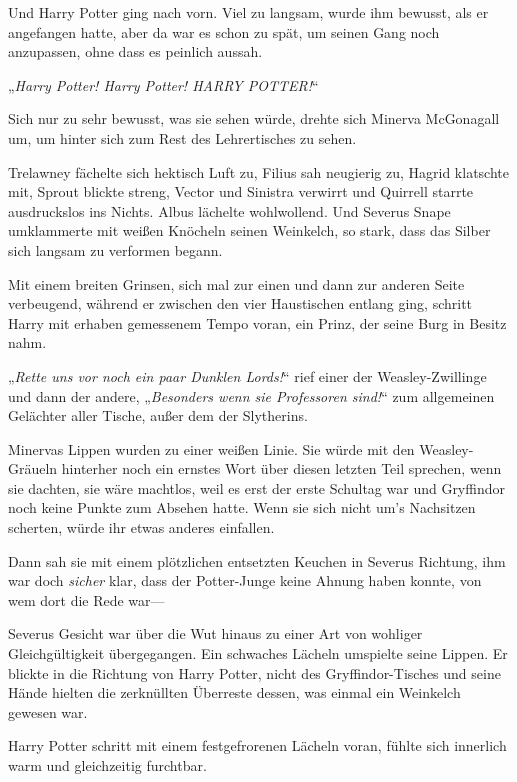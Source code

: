 {Und Harry Potter ging nach vorn. Viel zu langsam, wurde ihm bewusst, als er angefangen hatte, aber da war es schon zu spät, um seinen Gang noch anzupassen, ohne dass es peinlich aussah.

\later

„\emph{Harry Potter! Harry Potter! HARRY POTTER!}“

Sich nur zu sehr bewusst, was sie sehen würde, drehte sich Minerva McGonagall um, um hinter sich zum Rest des Lehrertisches zu sehen.

Trelawney fächelte sich hektisch Luft zu, Filius sah neugierig zu, Hagrid klatschte mit, Sprout blickte streng, Vector und Sinistra verwirrt und Quirrell starrte ausdruckslos ins Nichts. Albus lächelte wohlwollend. Und Severus Snape umklammerte mit weißen Knöcheln seinen Weinkelch, so stark, dass das Silber sich langsam zu verformen begann.

Mit einem breiten Grinsen, sich mal zur einen und dann zur anderen Seite verbeugend, während er zwischen den vier Haustischen entlang ging, schritt Harry mit erhaben gemessenem Tempo voran, ein Prinz, der seine Burg in Besitz nahm.

„\emph{Rette uns vor noch ein paar Dunklen Lords!}“ rief einer der Weasley-Zwillinge und dann der andere, „\emph{Besonders wenn sie Professoren sind!}“ zum allgemeinen Gelächter aller Tische, außer dem der Slytherins.

Minervas Lippen wurden zu einer weißen Linie. Sie würde mit den Weasley-Gräueln hinterher noch ein ernstes Wort über diesen letzten Teil sprechen, wenn sie dachten, sie wäre machtlos, weil es erst der erste Schultag war und Gryffindor noch keine Punkte zum Absehen hatte. Wenn sie sich nicht um's Nachsitzen scherten, würde ihr etwas anderes einfallen.

Dann sah sie mit einem plötzlichen entsetzten Keuchen in Severus Richtung, ihm war doch \emph{sicher} klar, dass der Potter-Junge keine Ahnung haben konnte, von wem dort die Rede war—

Severus Gesicht war über die Wut hinaus zu einer Art von wohliger Gleichgültigkeit übergegangen. Ein schwaches Lächeln umspielte seine Lippen. Er blickte in die Richtung von Harry Potter, nicht des Gryffindor-Tisches und seine Hände hielten die zerknüllten Überreste dessen, was einmal ein Weinkelch gewesen war.

\later

Harry Potter schritt mit einem festgefrorenen Lächeln voran, fühlte sich innerlich warm und gleichzeitig furchtbar.

}

